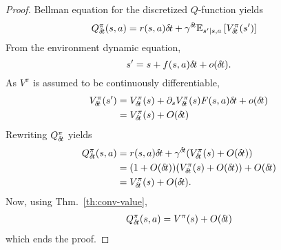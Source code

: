 \begin{proof}
Bellman equation for the discretized $Q$-function yields
  \begin{align}
    Q^\pi_{\delta\hspace{-.1em}t}(s, a) &= r(s, a){\delta\hspace{-.1em}t} + \gamma^{\delta\hspace{-.1em}t} \mathbb{E}_{s'|s, a}\left[V^\pi_{\delta\hspace{-.1em}t}(s')\right] 
  \end{align}
  From the environment dynamic equation, 
  \begin{equation}
  s' = s + f(s, a) {\delta\hspace{-.1em}t} + o({\delta\hspace{-.1em}t}).
  \end{equation}As $V^\pi$ is assumed to be continuously differentiable,
  \begin{align}
  V^\pi_{\delta\hspace{-.1em}t}(s') &= V^\pi_{\delta\hspace{-.1em}t}(s) + \partial_s V^\pi_{\delta\hspace{-.1em}t}(s) F(s, a){\delta\hspace{-.1em}t} + o({\delta\hspace{-.1em}t})\\
		    &= V^\pi_{\delta\hspace{-.1em}t}(s) + O({\delta\hspace{-.1em}t})
  \end{align}
  Rewriting $Q^\pi_{\delta\hspace{-.1em}t}$ yields
  \begin{align}
  Q^\pi_{\delta\hspace{-.1em}t}(s, a) &= r(s, a){\delta\hspace{-.1em}t} + \gamma^{\delta\hspace{-.1em}t} (V^\pi_{\delta\hspace{-.1em}t}(s) + O({\delta\hspace{-.1em}t}))\\
		      &= (1 + O({\delta\hspace{-.1em}t})) (V^\pi_{\delta\hspace{-.1em}t}(s) + O({\delta\hspace{-.1em}t})) + O({\delta\hspace{-.1em}t})\\
		      &= V^\pi_{\delta\hspace{-.1em}t}(s) + O({\delta\hspace{-.1em}t}).
  \end{align}
  Now, using Thm.~\ref{th:conv-value},
  \begin{align}
  Q^\pi_{\delta\hspace{-.1em}t}(s, a) = V^\pi(s) + O({\delta\hspace{-.1em}t})
  \end{align}
  which ends the proof.
  \end{proof}
